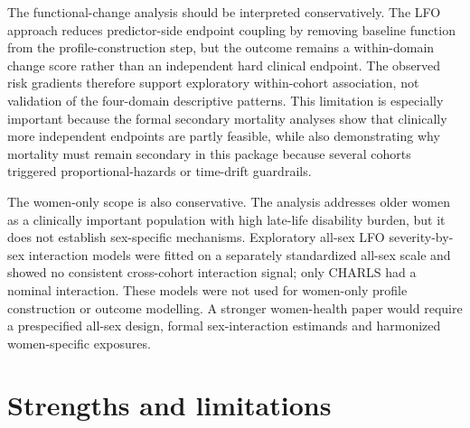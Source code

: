 \documentclass[pdflatex,sn-vancouver-num]{sn-jnl}
\begin{document}
The functional-change analysis should be interpreted conservatively. The LFO approach reduces predictor-side endpoint coupling by removing baseline function from the profile-construction step, but the outcome remains a within-domain change score rather than an independent hard clinical endpoint. The observed risk gradients therefore support exploratory within-cohort association, not validation of the four-domain descriptive patterns. This limitation is especially important because the formal secondary mortality analyses show that clinically more independent endpoints are partly feasible, while also demonstrating why mortality must remain secondary in this package because several cohorts triggered proportional-hazards or time-drift guardrails.

The women-only scope is also conservative. The analysis addresses older women as a clinically important population with high late-life disability burden, but it does not establish sex-specific mechanisms. Exploratory all-sex LFO severity-by-sex interaction models were fitted on a separately standardized all-sex scale and showed no consistent cross-cohort interaction signal; only CHARLS had a nominal interaction. These models were not used for women-only profile construction or outcome modelling. A stronger women-health paper would require a prespecified all-sex design, formal sex-interaction estimands and harmonized women-specific exposures.

\section{Strengths and limitations}\label{sec:limitations}
\end{document}

